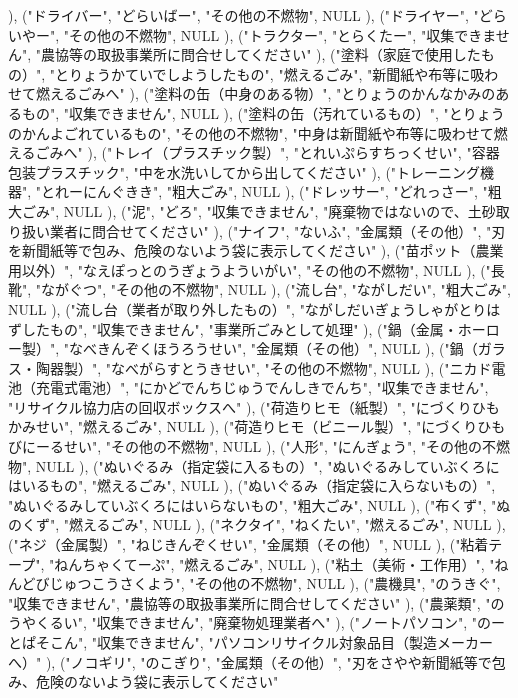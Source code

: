 ), ("ドライバー", "どらいばー", "その他の不燃物", NULL
), ("ドライヤー", "どらいやー", "その他の不燃物", NULL
), ("トラクター", "とらくたー", "収集できません", "農協等の取扱事業所に問合せしてください"
), ("塗料（家庭で使用したもの）", "とりょうかていでしようしたもの", "燃えるごみ", "新聞紙や布等に吸わせて燃えるごみへ"
), ("塗料の缶（中身のある物）", "とりょうのかんなかみのあるもの", "収集できません", NULL
), ("塗料の缶（汚れているもの）", "とりょうのかんよごれているもの", "その他の不燃物", "中身は新聞紙や布等に吸わせて燃えるごみへ"
), ("トレイ（プラスチック製）", "とれいぷらすちっくせい", "容器包装プラスチック", "中を水洗いしてから出してください"
), ("トレーニング機器", "とれーにんぐきき", "粗大ごみ", NULL
), ("ドレッサー", "どれっさー", "粗大ごみ", NULL
), ("泥", "どろ", "収集できません", "廃棄物ではないので、土砂取り扱い業者に問合せてください"
), ("ナイフ", "ないふ", "金属類（その他）", "刃を新聞紙等で包み、危険のないよう袋に表示してください"
), ("苗ポット（農業用以外）", "なえぽっとのうぎょうよういがい", "その他の不燃物", NULL
), ("長靴", "ながぐつ", "その他の不燃物", NULL
), ("流し台", "ながしだい", "粗大ごみ", NULL
), ("流し台（業者が取り外したもの）", "ながしだいぎょうしゃがとりはずしたもの", "収集できません", "事業所ごみとして処理"
), ("鍋（金属・ホーロー製）", "なべきんぞくほうろうせい", "金属類（その他）", NULL
), ("鍋（ガラス・陶器製）", "なべがらすとうきせい", "その他の不燃物", NULL
), ("ニカド電池（充電式電池）", "にかどでんちじゅうでんしきでんち", "収集できません", "リサイクル協力店の回収ボックスへ"
), ("荷造りヒモ（紙製）", "にづくりひもかみせい", "燃えるごみ", NULL
), ("荷造りヒモ（ビニール製）", "にづくりひもびにーるせい", "その他の不燃物", NULL
), ("人形", "にんぎょう", "その他の不燃物", NULL
), ("ぬいぐるみ（指定袋に入るもの）", "ぬいぐるみしていぶくろにはいるもの", "燃えるごみ", NULL
), ("ぬいぐるみ（指定袋に入らないもの）", "ぬいぐるみしていぶくろにはいらないもの", "粗大ごみ", NULL
), ("布くず", "ぬのくず", "燃えるごみ", NULL
), ("ネクタイ", "ねくたい", "燃えるごみ", NULL
), ("ネジ（金属製）", "ねじきんぞくせい", "金属類（その他）", NULL
), ("粘着テープ", "ねんちゃくてーぷ", "燃えるごみ", NULL
), ("粘土（美術・工作用）", "ねんどびじゅつこうさくよう", "その他の不燃物", NULL
), ("農機具", "のうきぐ", "収集できません", "農協等の取扱事業所に問合せしてください"
), ("農薬類", "のうやくるい", "収集できません", "廃棄物処理業者へ"
), ("ノートパソコン", "のーとぱそこん", "収集できません", "パソコンリサイクル対象品目（製造メーカーへ）"
), ("ノコギリ", "のこぎり", "金属類（その他）", "刃をさやや新聞紙等で包み、危険のないよう袋に表示してください"

